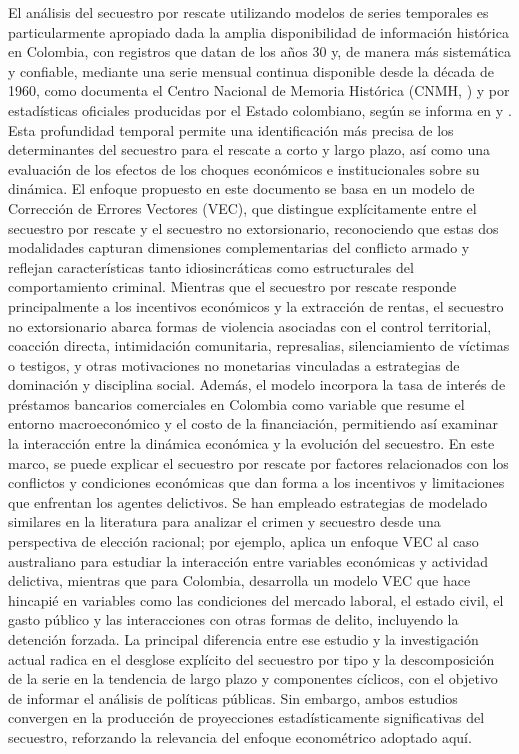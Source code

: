 \documentclass[12pt]{article}
\providecommand{\textcite}{\citet}
\theoremstyle{definition}
\theoremstyle{remark}
\newcommand{\1}{\mathbf{1}}
\begin{document}
El análisis del secuestro por rescate utilizando modelos de series temporales es particularmente apropiado dada la amplia disponibilidad de información histórica en Colombia, con registros que datan de los años 30 y, de manera más sistemática y confiable, mediante una serie mensual continua disponible desde la década de 1960, como documenta el Centro Nacional de Memoria Histórica (CNMH, \textcite{CNMH2013}) y por estadísticas oficiales producidas por el Estado colombiano, según se informa en \textcite{cnmh_datos} y \textcite{mindefensa_stats}. Esta profundidad temporal permite una identificación más precisa de los determinantes del secuestro para el rescate a corto y largo plazo, así como una evaluación de los efectos de los choques económicos e institucionales sobre su dinámica. El enfoque propuesto en este documento se basa en un modelo de Corrección de Errores Vectores (VEC), que distingue explícitamente entre el secuestro por rescate y el secuestro no extorsionario, reconociendo que estas dos modalidades capturan dimensiones complementarias del conflicto armado y reflejan características tanto idiosincráticas como estructurales del comportamiento criminal. Mientras que el secuestro por rescate responde principalmente a los incentivos económicos y la extracción de rentas, el secuestro no extorsionario abarca formas de violencia asociadas con el control territorial, coacción directa, intimidación comunitaria, represalias, silenciamiento de víctimas o testigos, y otras motivaciones no monetarias vinculadas a estrategias de dominación y disciplina social. Además, el modelo incorpora la tasa de interés de préstamos bancarios comerciales en Colombia como variable que resume el entorno macroeconómico y el costo de la financiación, permitiendo así examinar la interacción entre la dinámica económica y la evolución del secuestro. En este marco, se puede explicar el secuestro por rescate por factores relacionados con los conflictos y condiciones económicas que dan forma a los incentivos y limitaciones que enfrentan los agentes delictivos. Se han empleado estrategias de modelado similares en la literatura para analizar el crimen y secuestro desde una perspectiva de elección racional; por ejemplo, \textcite{Masih1995} aplica un enfoque VEC al caso australiano para estudiar la interacción entre variables económicas y actividad delictiva, mientras que para Colombia, \textcite{Suarez_2025} desarrolla un modelo VEC que hace hincapié en variables como las condiciones del mercado laboral, el estado civil, el gasto público y las interacciones con otras formas de delito, incluyendo la detención forzada. La principal diferencia entre ese estudio y la investigación actual radica en el desglose explícito del secuestro por tipo y la descomposición de la serie en la tendencia de largo plazo y componentes cíclicos, con el objetivo de informar el análisis de políticas públicas. Sin embargo, ambos estudios convergen en la producción de proyecciones estadísticamente significativas del secuestro, reforzando la relevancia del enfoque econométrico adoptado aquí.
\end{document}
